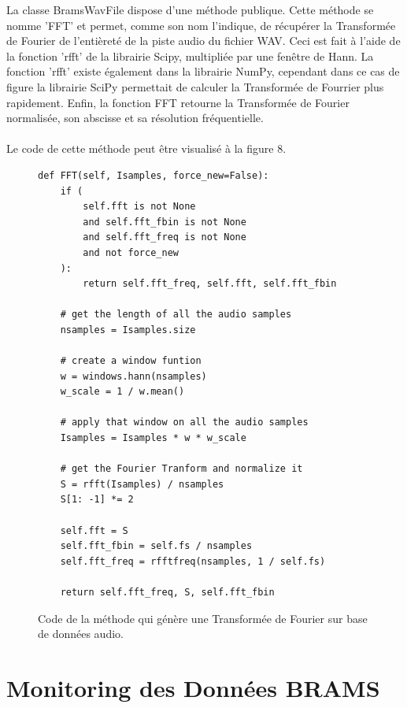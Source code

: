 \documentclass[11pt]{article}
\begin{document}
La classe BramsWavFile dispose d'une méthode publique.
Cette méthode se nomme 'FFT' et permet, comme son nom l'indique, de récupérer la Transformée de Fourier de l'entièreté de la piste audio du fichier WAV.
Ceci est fait à l'aide de la fonction 'rfft' de la librairie Scipy, multipliée par une fenêtre de Hann.
La fonction 'rfft' existe également dans la librairie NumPy, cependant dans ce cas de figure la librairie SciPy permettait de calculer la Transformée de Fourrier plus rapidement.
Enfin, la fonction FFT retourne la Transformée de Fourier normalisée, son abscisse et sa résolution fréquentielle.\\
\\
Le code de cette méthode peut être visualisé à la figure 8.

\begin{figure}
    \begin{lstlisting}[style=CStyle]
def FFT(self, Isamples, force_new=False):
    if (
        self.fft is not None
        and self.fft_fbin is not None
        and self.fft_freq is not None
        and not force_new
    ):
        return self.fft_freq, self.fft, self.fft_fbin

    # get the length of all the audio samples
    nsamples = Isamples.size

    # create a window funtion
    w = windows.hann(nsamples)
    w_scale = 1 / w.mean()

    # apply that window on all the audio samples
    Isamples = Isamples * w * w_scale

    # get the Fourier Tranform and normalize it
    S = rfft(Isamples) / nsamples
    S[1: -1] *= 2

    self.fft = S
    self.fft_fbin = self.fs / nsamples
    self.fft_freq = rfftfreq(nsamples, 1 / self.fs)

    return self.fft_freq, S, self.fft_fbin
    \end{lstlisting}
    \caption{Code de la méthode qui génère une Transformée de Fourier sur base de données audio.}
\end{figure}

\newpage

\section{Monitoring des Données BRAMS}
\end{document}
